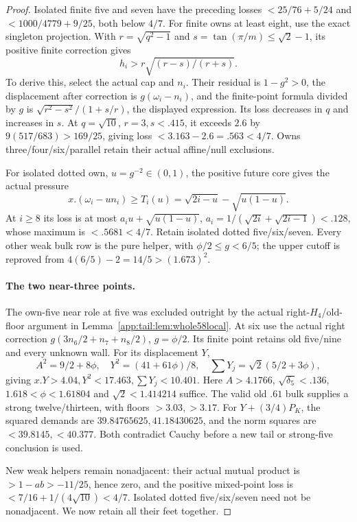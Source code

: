 \documentclass[11pt]{article}
\theoremstyle{definition}
\theoremstyle{remark}
\begin{document}
\begin{proof}
Isolated finite five and seven have the preceding losses
$<25/76+5/24$ and $<1000/4779+9/25$, both below $4/7$.
For finite owns at least eight, use the exact singleton projection.
With $r=\sqrt{q^2-1}$ and $s=\tan(\pi/m)\le\sqrt2-1$, its
positive finite correction gives
\[
 h_i>r\sqrt{(r-s)/(r+s)}.
\]
To derive this, select the actual cap and $n_i$. Their residual is
$1-g^2>0$, the displacement after correction is $g(\omega_i-n_i)$,
and the finite-point formula divided by $g$ is
$\sqrt{r^2-s^2}/(1+s/r)$, the displayed expression.
Its loss decreases in $q$ and increases in $s$. At $q=\sqrt{10}$,
$r=3,s<.415$, it exceeds $2.6$ by
$9(517/683)>169/25$, giving loss $<3.163-2.6=.563<4/7$.
Owns three/four/six/parallel retain their actual affine/null exclusions.

For isolated dotted own, $u=g^{-2}\in(0,1)$, the positive future
core gives the actual pressure
\[
 x.(\omega_i-u n_i)\ge T_i(u)
 =\sqrt{2i-u}-\sqrt{u(1-u)}.
\]
At $i\ge8$ its loss is at most
$a_i u+\sqrt{u(1-u)}$, $a_i=1/(\sqrt{2i}+\sqrt{2i-1})<.128$,
whose maximum is $<.5681<4/7$. Retain isolated dotted five/six/seven.
Every other weak bulk row is the pure helper, with
$\phi/2\le g<6/5$; the upper cutoff is reproved from
$4(6/5)-2=14/5>(1.673)^2$.

\paragraph{The two near-three points.}
The own-five near role at five was excluded outright by the actual
right-$H_4$/old-floor argument in
Lemma~\ref{app:tail:lem:whole58local}. At six use the actual
right correction $g(3n_6/2+n_7+n_8/2)$, $g=\phi/2$.
Its finite point retains old five/nine and every unknown wall.
For its displacement $Y$,
\[
 A^2=9/2+8\phi,\quad Y^2=(41+61\phi)/8,\quad
 \sum Y_j=\sqrt2(5/2+3\phi),
\]
giving $x.Y>4.04,Y^2<17.463,\sum Y_j<10.401$.
Here $A>4.1766$, $\sqrt{\delta_5}<.136$,
$1.618<\phi<1.61804$ and $\sqrt2<1.414214$ suffice.
The valid old $.61$ bulk supplies a strong twelve/thirteen, with
floors $>3.03,>3.17$. For $Y+(3/4)P_K$, the squared demands are
$39.84765625,41.18430625$, and the norm squares are
$<39.8145,<40.377$. Both contradict Cauchy before a new tail or
strong-five conclusion is used.

New weak helpers remain nonadjacent: their actual mutual product
is $>1-ab>-11/25$, hence zero, and the positive mixed-point loss
is $<7/16+1/(4\sqrt{10})<4/7$. Isolated dotted five/six/seven
need not be nonadjacent. We now retain all their feet together.


\end{proof}
\end{document}

